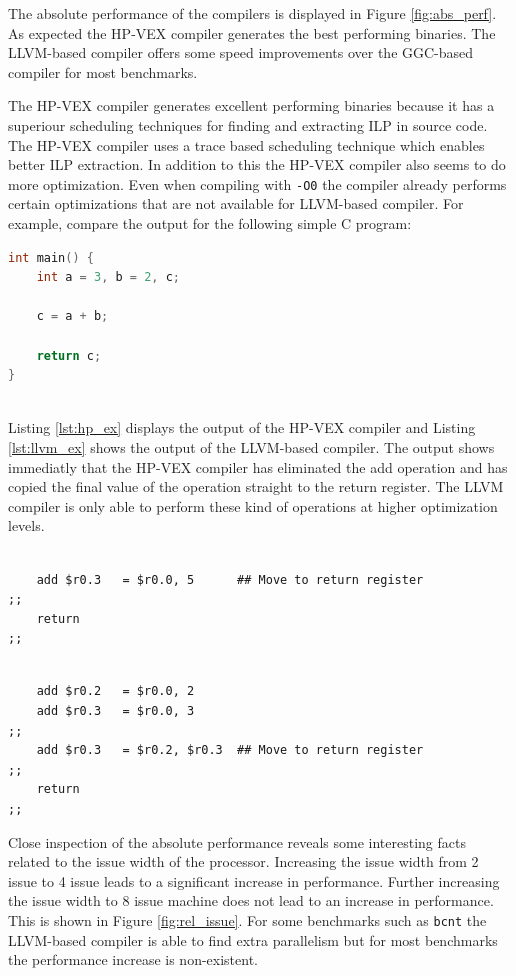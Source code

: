 The absolute performance of the compilers is displayed in Figure \ref{fig:abs_perf}. As expected the HP-VEX compiler generates the best performing binaries. The LLVM-based compiler offers some speed improvements over the GGC-based compiler for most benchmarks. 

The HP-VEX compiler generates excellent performing binaries because it has a superiour scheduling techniques for finding and extracting ILP in source code. The HP-VEX compiler uses a trace based scheduling technique which enables better ILP extraction. In addition to this the HP-VEX compiler also seems to do more optimization. Even when compiling with \texttt{-O0} the compiler already performs certain optimizations that are not available for LLVM-based compiler. For example, compare the output for the following simple C program:

\begin{lstlisting}[language=c]
int main() {
	int a = 3, b = 2, c;

	c = a + b;

	return c;
}
	
\end{lstlisting}

Listing \ref{lst:hp_ex} displays the output of the HP-VEX compiler and Listing \ref{lst:llvm_ex} shows the output of the LLVM-based compiler. The output shows immediatly that the HP-VEX compiler has eliminated the add operation and has copied the final value of the operation straight to the return register. The LLVM compiler is only able to perform these kind of operations at higher optimization levels.

\begin{lstlisting}[language=rvex,label=lst:hp_ex, caption={HP compiler output}]

	add $r0.3   = $r0.0, 5  	## Move to return register
;;
	return
;;
\end{lstlisting}

\begin{lstlisting}[language=rvex,label=lst:llvm_ex, caption={LLVM compiler output}]

	add $r0.2 	= $r0.0, 2
	add $r0.3 	= $r0.0, 3	
;;
	add $r0.3   = $r0.2, $r0.3  ## Move to return register
;;
	return
;;
\end{lstlisting}

Close inspection of the absolute performance reveals some interesting facts related to the issue width of the processor. Increasing the issue width from 2 issue to 4 issue leads to a significant increase in performance. Further increasing the issue width to 8 issue machine does not lead to an increase in performance. This is shown in Figure \ref{fig:rel_issue}. For some benchmarks such as \texttt{bcnt} the LLVM-based compiler is able to find extra parallelism but for most benchmarks the performance increase is non-existent.


